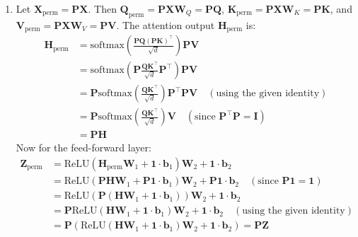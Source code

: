 

\begin{answer}
    \begin{enumerate}[label=(\alph*)]
        \item 
        \begin{subparts}
            \subpart Let $\mathbf{X}_{\text{perm}} = \mathbf{P}\mathbf{X}$. 
            Then $\mathbf{Q}_{\text{perm}} = \mathbf{P}\mathbf{X}\mathbf{W}_Q = \mathbf{P}\mathbf{Q}$, $\mathbf{K}_{\text{perm}} = \mathbf{P}\mathbf{X}\mathbf{W}_K = \mathbf{P}\mathbf{K}$, and $\mathbf{V}_{\text{perm}} = \mathbf{P}\mathbf{X}\mathbf{W}_V = \mathbf{P}\mathbf{V}$.
            The attention output $\mathbf{H}_{\text{perm}}$ is:
            \begin{align*}
                \mathbf{H}_{\text{perm}} &= \text{softmax}\left(\frac{\mathbf{P}\mathbf{Q}(\mathbf{P}\mathbf{K})^{\top}}{\sqrt{d}}\right) \mathbf{P}\mathbf{V} \\
                &= \text{softmax}\left(\mathbf{P} \frac{\mathbf{Q}\mathbf{K}^{\top}}{\sqrt{d}} \mathbf{P}^{\top}\right) \mathbf{P}\mathbf{V} \\
                &= \mathbf{P} \text{softmax}\left(\frac{\mathbf{Q}\mathbf{K}^{\top}}{\sqrt{d}}\right) \mathbf{P}^{\top} \mathbf{P}\mathbf{V} \quad (\text{using the given identity}) \\
                &= \mathbf{P} \text{softmax}\left(\frac{\mathbf{Q}\mathbf{K}^{\top}}{\sqrt{d}}\right) \mathbf{V} \quad (\text{since } \mathbf{P}^{\top}\mathbf{P} = \mathbf{I}) \\
                &= \mathbf{P}\mathbf{H}
            \end{align*}
            Now for the feed-forward layer:
            \begin{align*}
                \mathbf{Z}_{\text{perm}} &= \text{ReLU}(\mathbf{H}_{\text{perm}}\mathbf{W}_1 + \mathbf{1}\cdot\mathbf{b}_1)\mathbf{W}_2 + \mathbf{1}\cdot\mathbf{b}_2 \\
                &= \text{ReLU}(\mathbf{P}\mathbf{H}\mathbf{W}_1 + \mathbf{P}\mathbf{1}\cdot\mathbf{b}_1)\mathbf{W}_2 + \mathbf{P}\mathbf{1}\cdot\mathbf{b}_2 \quad (\text{since } \mathbf{P}\mathbf{1} = \mathbf{1}) \\
                &= \text{ReLU}(\mathbf{P}(\mathbf{H}\mathbf{W}_1 + \mathbf{1}\cdot\mathbf{b}_1))\mathbf{W}_2 + \mathbf{1}\cdot\mathbf{b}_2 \\
                &= \mathbf{P} \text{ReLU}(\mathbf{H}\mathbf{W}_1 + \mathbf{1}\cdot\mathbf{b}_1)\mathbf{W}_2 + \mathbf{1}\cdot\mathbf{b}_2 \quad (\text{using the given identity}) \\
                &= \mathbf{P} (\text{ReLU}(\mathbf{H}\mathbf{W}_1 + \mathbf{1}\cdot\mathbf{b}_1)\mathbf{W}_2 + \mathbf{1}\cdot\mathbf{b}_2) = \mathbf{P}\mathbf{Z}
            \end{align*}
            

\end{subparts}
\end{enumerate}
\end{answer}
